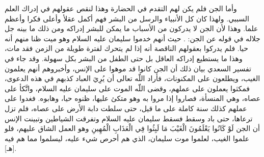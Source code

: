 
وأما الجن فلم يكن لهم التقدم في الحضارة وهذا لنقص عقولهم في إدراك العلم السببي. ولهذا كان كل الأنبياء والرسل من البشر فهم أكمل عقلأ وأعلى فكرا وأعظم علما. وهذا لأن الجن لا يدركون من الأسباب ما يمكن للبشر إدراكه ومن ذلك ما بينه جل جلاله في قوله عن الجن: 
\quranayah*[34][14]{\footnotesize \surahname*[34]}. حيث أنهم خدموا سليمان عليه السلام وهو ميت ظنا منهم أنه حيا. فلم يدركوا بعقولهم الناقصة أنه إذا لم يتحرك لفترة طويلة من الزمن فقد مات، وهذا ما يستطيع إدراكه العاقل بل حتى الطفل من البشر بكل سهولة. وقد جاء في تفسير السعدي بيان ذلك أن الجن كانوا قد موهوا على الإنس، وأخبروهم أنهم يعلمون الغيب، ويطلعون على المكنونات، فأراد اللّه تعالى أن يُرِيَ العباد كذبهم في هذه الدعوى، فمكثوا يعملون على عملهم، وقضى اللّه الموت على سليمان عليه السلام، واتَّكأ على عصاه، وهي المنسأة، فصاروا إذا مروا به وهو متكئ عليها، ظنوه حيا، وهابوه. فغدوا على عملهم كذلك سنة كاملة على ما قيل، حتى سلطت دابة الأرض على عصاه، فلم تزل ترعاها، حتى باد وسقط فسقط سليمان عليه السلام وتفرقت الشياطين وتبينت الإنس أن الجن { لَوْ كَانُوا يَعْلَمُونَ الْغَيْبَ مَا لَبِثُوا فِي الْعَذَابِ الْمُهِينِ } وهو العمل الشاق عليهم، فلو علموا الغيب، لعلموا موت سليمان، الذي هم أحرص شيء عليه، ليسلموا مما هم فيه [هـ].


